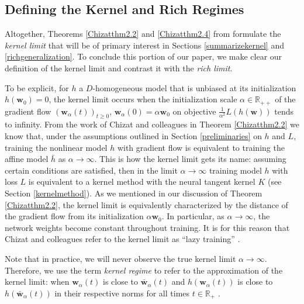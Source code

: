 \documentclass{article}
\begin{document}
\subsection{Defining the Kernel and Rich Regimes}\label{defkernelrich}

Altogether, Theorems \ref{Chizatthm2.2} and \ref{Chizatthm2.4} from \cite{chizat2018lazy} formulate the \textit{kernel limit} that will be of primary interest in Sections \ref{summarizekernel} and \ref{richgeneralization}. To conclude this portion of our paper, we make clear our definition of the kernel limit and contrast it with the \textit{rich limit}. 

To be explicit, for $h$ a $D$-homogeneous model that is unbiased at its initialization $h(\boldsymbol{w}_0) = 0$, the kernel limit occurs when the initialization scale $\alpha \in \mathbb{R}_{++}$ of the gradient flow $(\boldsymbol{w}_{\alpha}(t))_{t \geq 0}$, $\boldsymbol{w}_{\alpha}(0) = \alpha \boldsymbol{w}_0$ on objective $\frac{1}{\alpha^2}L(h(\boldsymbol{w}))$ tends to infinity. From the work of Chizat and colleagues in Theorem \ref{Chizatthm2.2} we know that, under the assumptions outlined in Section \ref{preliminaries} on $h$ and $L$, training the nonlinear model $h$ with gradient flow is equivalent to training the affine model $\bar{h}$ as $\alpha \rightarrow \infty$. This is how the kernel limit gets its name: assuming certain conditions are satisfied, then in the limit $\alpha \rightarrow \infty$ training model $h$ with loss $L$ is equivalent to a kernel method with the neural tangent kernel $K$ (see Section \ref{kernelmethod}). As we mentioned in our discussion of Theorem \ref{Chizatthm2.2}, the kernel limit is equivalently characterized by the distance of the gradient flow from its initialization $\alpha \boldsymbol{w}_0$. In particular, as $\alpha \rightarrow \infty$, the network weights become constant throughout training. It is for this reason that Chizat and colleagues refer to the kernel limit as \enquote{lazy training} \cite{chizat2018lazy}. 

Note that in practice, we will never observe the true kernel limit $\alpha \rightarrow \infty$. Therefore, we use the term \textit{kernel regime} to refer to the approximation of the kernel limit: when $\boldsymbol{w}_{\alpha}(t)$ is close to $\boldsymbol{\bar{w}}_{\alpha}(t)$ and $h(\boldsymbol{w}_{\alpha}(t))$ is close to $h(\boldsymbol{\bar{w}}_{\alpha}(t))$ in their respective norms for all times $t \in \mathbb{R}_+$ \cite{woodworth2020kernel}.
\end{document}
